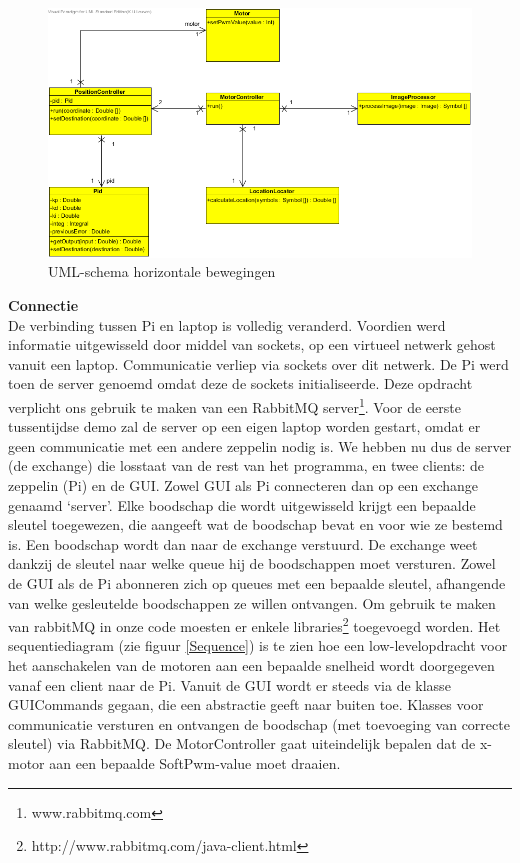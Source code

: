 \documentclass[tt]{penoverslag}
\begin{document}
\begin{figure}[H]
\begin{center}
\includegraphics[width=\textwidth]{XYNavigation.png}
\end{center}
\caption{UML-schema horizontale bewegingen}
\label{navigation}
\end{figure}

\textbf{Connectie}\\
De verbinding tussen Pi en laptop is volledig veranderd. Voordien werd informatie uitgewisseld door middel van sockets, op een virtueel netwerk gehost vanuit een laptop. Communicatie verliep via sockets over dit netwerk. De Pi werd toen de server genoemd omdat deze de sockets initialiseerde. Deze opdracht verplicht ons gebruik te maken van een RabbitMQ server\footnote{www.rabbitmq.com}. Voor de eerste tussentijdse demo zal de server op een eigen laptop worden gestart, omdat er geen communicatie met een andere zeppelin nodig is. We hebben nu dus de server (de exchange) die losstaat van de rest van het programma, en twee clients: de zeppelin (Pi) en de GUI. Zowel GUI als Pi connecteren dan op een exchange genaamd ‘server’. Elke boodschap die wordt uitgewisseld krijgt een bepaalde sleutel toegewezen, die aangeeft wat de boodschap bevat en voor wie ze bestemd is. Een boodschap wordt dan naar de exchange verstuurd. De exchange weet dankzij de sleutel naar welke queue hij de boodschappen moet versturen. Zowel de GUI als de Pi abonneren zich op queues met een bepaalde sleutel, afhangende van welke gesleutelde boodschappen ze willen ontvangen. Om gebruik te maken van rabbitMQ in onze code moesten er enkele libraries\footnote{http://www.rabbitmq.com/java-client.html} toegevoegd worden. Het sequentiediagram (zie figuur \ref{Sequence}) is te zien hoe een low-levelopdracht voor het aanschakelen van de motoren aan een bepaalde snelheid wordt doorgegeven vanaf een client naar de Pi. Vanuit de GUI wordt er steeds via de klasse GUICommands gegaan, die een abstractie geeft naar buiten toe. Klasses voor communicatie versturen en ontvangen de boodschap (met toevoeging van correcte sleutel) via RabbitMQ. De MotorController gaat uiteindelijk bepalen dat de x-motor aan een bepaalde SoftPwm-value moet draaien.
\\
\end{document}

